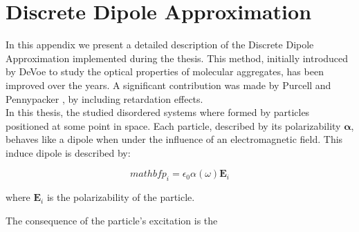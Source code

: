 \chapter{Discrete Dipole Approximation}

In this appendix we present a detailed description of the Discrete Dipole Approximation implemented during the thesis.
This method, initially introduced by DeVoe \cite{devoe1964optical} to study the optical properties of molecular aggregates, has been improved over the years. A significant contribution was made by Purcell and Pennypacker \cite{Purcell_1973}, by including retardation effects.\\
In this thesis, the studied disordered systems where formed by particles positioned at some point in space. Each particle, described by its polarizability $\boldsymbol{\alpha}$, behaves like a dipole when under the influence of an electromagnetic field. This induce dipole is described by:

\begin{equation}
mathbf{p}_i = \epsilon_{0}\alpha\left(\omega\right)\mathbf{E}_i
\end{equation}

where $\mathbf{E}_i$ is the polarizability of the particle.


The consequence of the particle's excitation is the 
